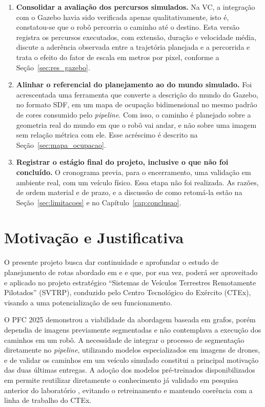 \documentclass[
    12pt,
    openright,
    oneside,
    a4paper,
    english,
    brazil
]{abntex2}
\begin{document}
\begin{enumerate}
    \item \textbf{Consolidar a avaliação dos percursos simulados.} Na VC, a integração com o Gazebo havia sido verificada apenas qualitativamente, isto é, constatou-se que o robô percorria o caminho até o destino. Esta versão registra os percursos executados, com extensão, duração e velocidade média, discute a aderência observada entre a trajetória planejada e a percorrida e trata o efeito do fator de escala em metros por pixel, conforme a Seção~\ref{sec:res_gazebo}.

    \item \textbf{Alinhar o referencial do planejamento ao do mundo simulado.} Foi acrescentada uma ferramenta que converte a descrição do mundo do Gazebo, no formato SDF, em um mapa de ocupação bidimensional no mesmo padrão de cores consumido pelo \textit{pipeline}. Com isso, o caminho é planejado sobre a geometria real do mundo em que o robô vai andar, e não sobre uma imagem sem relação métrica com ele. Esse acréscimo é descrito na Seção~\ref{sec:mapa_ocupacao}.

    \item \textbf{Registrar o estágio final do projeto, inclusive o que não foi concluído.} O cronograma previa, para o encerramento, uma validação em ambiente real, com um veículo físico. Essa etapa não foi realizada. As razões, de ordem material e de prazo, e a discussão de como retomá-la estão na Seção~\ref{sec:limitacoes} e no Capítulo~\ref{cap:conclusao}.
\end{enumerate}

\section{Motivação e Justificativa}

O presente projeto busca dar continuidade e aprofundar o estudo de planejamento de rotas abordado em \cite{camelo2025} e \cite{junior2024} e que, por sua vez, poderá ser aproveitado e aplicado no projeto estratégico ``Sistemas de Veículos Terrestres Remotamente Pilotados'' (SVTRP), conduzido pelo Centro Tecnológico do Exército (CTEx), visando a uma potencialização de seu funcionamento.

O PFC 2025 demonstrou a viabilidade da abordagem baseada em grafos, porém dependia de imagens previamente segmentadas e não contemplava a execução dos caminhos em um robô. A necessidade de integrar o processo de segmentação diretamente no \textit{pipeline}, utilizando modelos especializados em imagens de drones, e de validar os caminhos em um veículo simulado constitui a principal motivação das duas últimas entregas. A adoção dos modelos pré-treinados disponibilizados em \cite{junior2024_models} permite reutilizar diretamente o conhecimento já validado em pesquisa anterior do laboratório \cite{junior2024}, evitando o retreinamento e mantendo coerência com a linha de trabalho do CTEx.
\end{document}
